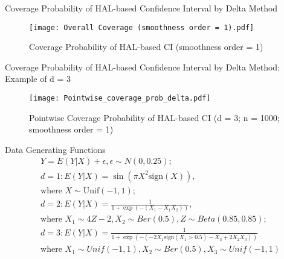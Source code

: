 \documentclass[t]{beamer}
\begin{document}
\begin{frame}{Coverage Probability of HAL-based Confidence Interval by Delta Method}
    \begin{figure}
        \centering
        \texttt{[image: Overall Coverage (smoothness order = 1).pdf]}
        \caption{Coverage Probability of HAL-based CI (smoothness order = 1)}
        \label{fig:my_label}
    \end{figure}
\end{frame}
\begin{frame}{Coverage Probability of HAL-based Confidence Interval by Delta Method: Example of d = 3}
    \begin{figure}
        \centering
        \texttt{[image: Pointwise\_coverage\_prob\_delta.pdf]}
        \caption{Pointwise Coverage Probability of HAL-based CI (d = 3; n = 1000; smoothness order = 1)}
        \label{fig:my_label}
    \end{figure}
\end{frame}

\begin{frame}{Data Generating Functions}
    \begin{align*}
        & Y = E(Y|X) + \epsilon, \epsilon \sim N(0, 0.25);\\
        &d = 1: E(Y|X) = \sin \left(\pi X^2 \text{sign}(X)\right), \\
        & \text{where }X \sim \text{Unif}(-1,1);\\
        &d = 2: E(Y|X)=\frac{1}{1+\exp\left(-(X_1-X_1 X_2)\right)},\\
        &\text{where }X_1 \sim 4Z-2, X_2 \sim Ber(0.5), Z \sim Beta(0.85,0.85); \\
        &d = 3: E(Y|X)=\frac{1}{1+\exp\left(-(-2X_1 \text{sign}(X_1>0.5)-X_3+2X_2 X_3)\right)} \\
        & \text{where } X_1 \sim Unif(-1,1), X_2 \sim Ber(0.5), X_3 \sim Unif(-1,1)\\
    \end{align*}
\end{frame}
\end{document}
